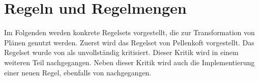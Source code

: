 \chapter{Regeln und Regelmengen}

Im Folgenden werden konkrete Regelsets vorgestellt, die zur Transformation von Plänen genutzt werden. Zuerst wird das Regelset von Pellenkoft vorgestellt. Das Regelset wurde von \cite{indien} als unvollständig kritisiert. Dieser Kritik wird in einem weiteren Teil nachgegangen. Neben dieser Kritik wird auch die Implementierung einer neuen Regel, ebenfalls von \cite{indien} nachgegangen. 



